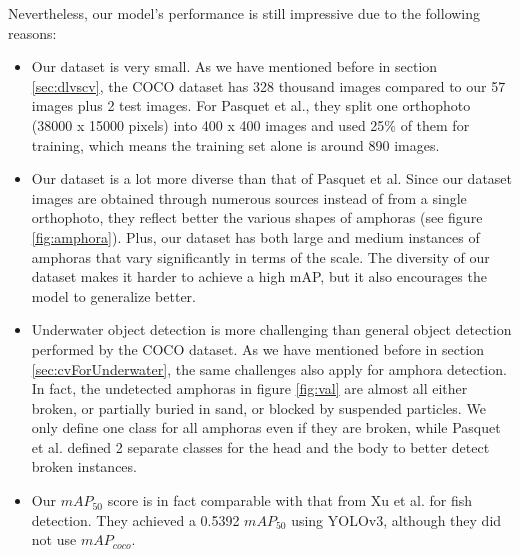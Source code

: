 \documentclass[a4paper, 11pt, oneside]{article}
\begin{document}
  Nevertheless, our model's performance is still impressive due to the following reasons:

  \begin{itemize}
    \item Our dataset is very small. As we have mentioned before in section \ref{sec:dlvscv}, the COCO dataset has 328
    thousand images compared to our 57 images plus 2 test images. For Pasquet et al., they split one orthophoto
    (38000 x 15000 pixels) into 400 x 400 images and used 25\% of them for training, which means the training set
    alone is around 890 images.
    \item Our dataset is a lot more diverse than that of Pasquet et al. Since our dataset images are obtained through
    numerous sources instead of from a single orthophoto, they reflect better the various shapes of amphoras (see
    figure \ref{fig:amphora}). Plus, our dataset has both large and medium instances of amphoras that vary significantly
    in terms of the scale. The diversity of our dataset makes it harder to achieve a high mAP, but it also encourages
    the model to generalize better.
    \item Underwater object detection is more challenging than general object detection performed by the COCO dataset.
    As we have mentioned before in section \ref{sec:cvForUnderwater}, the same challenges also apply for amphora
    detection. In fact, the undetected amphoras in figure \ref{fig:val} are almost all either broken, or partially buried
    in sand, or blocked by suspended particles. We only define one class for all amphoras even if they are broken, while
    Pasquet et al. defined 2 separate classes for the head and the body to better detect broken instances.
    \item Our $mAP_{50}$ score is in fact comparable with that from Xu et al. \cite{xu2018underwater} for fish detection.
    They achieved a 0.5392 $mAP_{50}$ using YOLOv3, although they did not use $mAP_{coco}$.
  \end{itemize}
\end{document}
